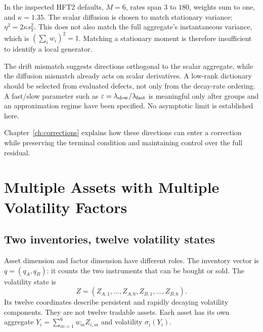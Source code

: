 In the inspected HFT2 defaults, $M=6$, rates span $3$ to $180$, weights sum to one, and $\kappa=1.35$. The scalar diffusion is chosen to match stationary variance: $\eta^2=2\kappa s_Y^2$. This does not also match the full aggregate's instantaneous variance, which is $(\sum_iw_i)^2=1$. Matching a stationary moment is therefore insufficient to identify a local generator.

The drift mismatch suggests directions orthogonal to the scalar aggregate, while the diffusion mismatch already acts on scalar derivatives. A low-rank dictionary should be selected from evaluated defects, not only from the decay-rate ordering. A fast/slow parameter such as $\varepsilon=\lambda_{\rm slow}/\lambda_{\rm fast}$ is meaningful only after groups and an approximation regime have been specified. No asymptotic limit is established here.

Chapter~\ref{ch:corrections} explains how these directions can enter a correction while preserving the terminal condition and maintaining control over the full residual.
\section{Multiple Assets with Multiple Volatility Factors}


\subsection{Two inventories, twelve volatility states}
Asset dimension and factor dimension have different roles. The inventory vector is $q=(q_A,q_B)$: it counts the two instruments that can be bought or sold. The volatility state is
\[
 Z=(Z_{A,1},\ldots,Z_{A,6},Z_{B,1},\ldots,Z_{B,6}).
\]
Its twelve coordinates describe persistent and rapidly decaying volatility components. They are not twelve tradable assets. Each asset has its own aggregate $Y_i=\sum_{m=1}^6w_mZ_{i,m}$ and volatility $\sigma_i(Y_i)$.

